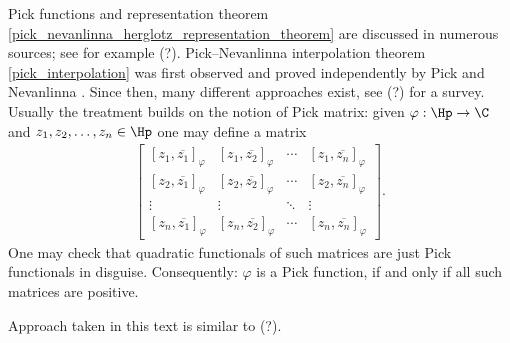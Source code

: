 Pick functions and representation theorem \ref{pick_nevanlinna_herglotz_representation_theorem} are discussed in numerous sources; see for example (?). Pick--Nevanlinna interpolation theorem \ref{pick_interpolation} was first observed and proved independently by Pick \cite{Pick} and Nevanlinna \cite{Nevan}. Since then, many different approaches exist, see (?) for a survey. Usually the treatment builds on the notion of Pick matrix: given $\varphi : \Hp \to \C$ and $z_{1}, z_{2}, \ldots, z_{n} \in \Hp$ one may define a matrix
\begin{align*}
	\begin{bmatrix}
		[z_{1}, \overline{z_{1}}]_{\varphi} & [z_{1}, \overline{z_{2}}]_{\varphi} & \cdots & [z_{1}, \overline{z_{n}}]_{\varphi} \\
		[z_{2}, \overline{z_{1}}]_{\varphi} & [z_{2}, \overline{z_{2}}]_{\varphi} & \cdots & [z_{2}, \overline{z_{n}}]_{\varphi} \\
		\vdots & \vdots & \ddots & \vdots \\
		[z_{n}, \overline{z_{1}}]_{\varphi} & [z_{n}, \overline{z_{2}}]_{\varphi} & \cdots &  [z_{n}, \overline{z_{n}}]_{\varphi}
	\end{bmatrix}.
\end{align*}
One may check that quadratic functionals of such matrices are just Pick functionals in disguise. Consequently: $\varphi$ is a Pick function, if and only if all such matrices are positive.

Approach taken in this text is similar to (?).
\begin{comment}

TODO:
\begin{itemize}
	\item Examples of representing measures behind functions and functions behind representing measures
	\item Spectral commutant lifting theorem
	\item Use Morera's theorem to prove weak Hindmarsh's theorem
	\item Nice formula for finite Pick extension (rational function case)
\end{itemize}

\end{comment}






